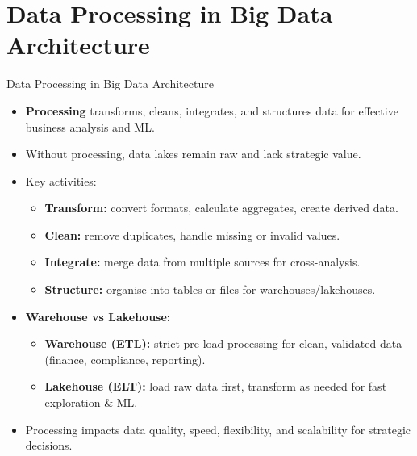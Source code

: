\documentclass[aspectratio=169, table]{beamer}
\begin{document}
\section{Data Processing in Big Data Architecture}

\begin{frame}{Data Processing in Big Data Architecture}
	\vspace{10pt}
	
	\begin{itemize}
		\item \textbf{Processing} transforms, cleans, integrates, and structures data for effective business analysis and ML.
		
		\item Without processing, data lakes remain raw and lack strategic value.
		
		\item Key activities:
		\begin{itemize}
			\item \textbf{Transform:} convert formats, calculate aggregates, create derived data.
			\item \textbf{Clean:} remove duplicates, handle missing or invalid values.
			\item \textbf{Integrate:} merge data from multiple sources for cross-analysis.
			\item \textbf{Structure:} organise into tables or files for warehouses/lakehouses.
		\end{itemize}
		
		\item \textbf{Warehouse vs Lakehouse:}
		\begin{itemize}
			\item \textbf{Warehouse (ETL):} strict pre-load processing for clean, validated data (finance, compliance, reporting).
			\item \textbf{Lakehouse (ELT):} load raw data first, transform as needed for fast exploration \& ML.
		\end{itemize}
		
		\item Processing impacts data quality, speed, flexibility, and scalability for strategic decisions.
	\end{itemize}
	
\end{frame}
\end{document}
